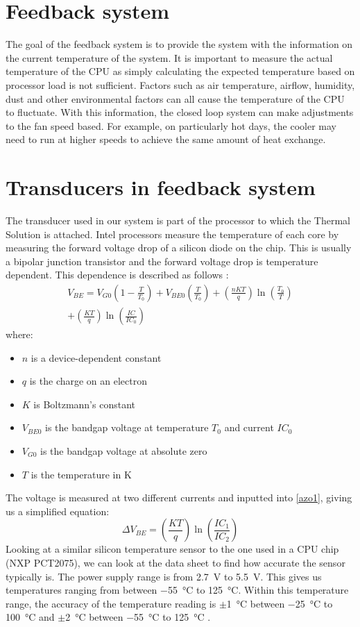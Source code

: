 \documentclass[conference]{IEEEtran}
\begin{document}
\section{Feedback system}
The goal of the feedback system is to provide the system with the information on the current temperature of the system. It is important to measure the actual temperature of the CPU as simply calculating the expected temperature based on processor load is not sufficient. Factors such as air temperature, airflow, humidity, dust and other environmental factors can all cause the temperature of the CPU to fluctuate. With this information, the closed loop system can make adjustments to the fan speed based. For example, on particularly hot days, the cooler may need to run at higher speeds to achieve the same amount of heat exchange. 
\section{Transducers in feedback system}
The transducer used in our system is part of the processor to which the Thermal Solution is attached. Intel processors measure the temperature of each core by measuring the forward voltage drop of a silicon diode on the chip. This is usually a bipolar junction transistor and the forward voltage drop is temperature dependent. This dependence is described as follows \cite{b2}:
\begin{multline}
    V_{BE} = V_{G0} \left(1-\frac{T}{T_0}\right) + V_{BE0}\left(\frac{T}{T_0}\right) + \left(\frac{nKT}{q}\right)\ln\left(\frac{T_0}{T}\right) \\+ \left(\frac{KT}{q}\right)\ln\left(\frac{IC}{IC_0}\right) \label{azo1}
\end{multline}
where:
\begin{itemize}
    \item $n$ is a device-dependent constant
    \item $q$ is the charge on an electron
    \item $K$ is Boltzmann's constant
    \item $V_{BE0}$ is the bandgap voltage at temperature $T_0$ and current $IC_0$
    \item $V_{G0}$ is the bandgap voltage at absolute zero
    \item $T$ is the temperature in \si{\kelvin}
\end{itemize}
The voltage is measured at two different currents and inputted into \eqref{azo1}, giving us a simplified equation:
\begin{equation}
    \Delta V_{BE} = \left(\frac{KT}{q}\right)\ln\left(\frac{IC_1}{IC_2}\right)
    \label{bandgap}
\end{equation}
Looking at a similar silicon temperature sensor to the one used in a CPU chip (NXP PCT2075), we can look at the data sheet to find how accurate the sensor typically is. The power supply range is from \SI{2.7}{\volt} to \SI{5.5}{\volt}. This gives us temperatures ranging from between \SI{-55}{\celsius} to \SI{+125}{\celsius}. Within this temperature range, the accuracy of the temperature reading is $\pm$\SI{1}{\celsius} between \SI{-25}{\celsius} to \SI{+100}{\celsius} and $\pm$\SI{2}{\celsius} between \SI{-55}{\celsius} to \SI{+125}{\celsius} \cite{b3}. 
\end{document}
